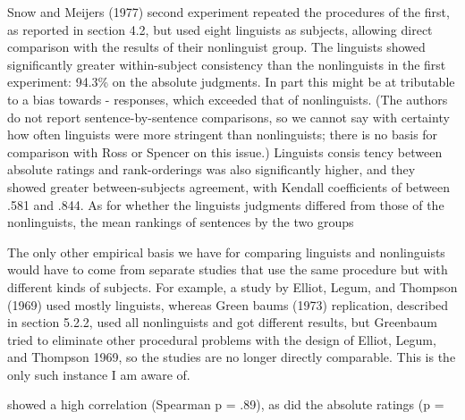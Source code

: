 \begin{styleTextbody}
Snow and Meijer{\textquotesingle}s (1977) second experiment repeated the procedures of the first, as reported in section 4.2, but used eight linguists as subjects, allowing direct comparison with the results of their nonlinguist group. The linguists showed significantly greater within-subject consistency than the nonlinguists in the first experiment: 94.3\% on the absolute judgments. In part this might be at\- tributable to a bias towards {\textquotedbl}-{\textquotedbl} responses, which exceeded that of nonlinguists. (The authors do not report sentence-by-sentence comparisons, so we cannot say with certainty how often linguists were more stringent than nonlinguists; there is no basis for comparison with Ross or Spencer on this issue.) Linguists{\textquotesingle} consis\- tency between absolute ratings and rank-orderings was also significantly higher, and they showed greater between-subjects agreement, with Kendall coefficients of between .581 and .844. As for whether the linguists{\textquotesingle} judgments differed from those of the nonlinguists, the mean rankings of sentences by the two groups
\end{styleTextbody}


\begin{listWWNumxxxviileveli}
\item 
\begin{styleStandard}
The only other empirical basis we have for comparing linguists and nonlinguists would have to come from separate studies that use the same procedure but with different kinds of subjects. For example, a study by Elliot, Legum, and Thompson (1969) used mostly linguists, whereas Green\- baum{\textquotesingle}s (1973) replication, described in section 5.2.2, used all nonlinguists and got different results, but Greenbaum tried to eliminate other procedural problems with the design of Elliot, Legum, and Thompson 1969, so the studies are no longer directly comparable. This is the only such instance I am aware of.
\end{styleStandard}


\end{listWWNumxxxviileveli}
\clearpage\setcounter{page}{1}\begin{styleTextbody}
showed a high correlation (Spearman p = .89), as did the absolute ratings (p =
\end{styleTextbody}


